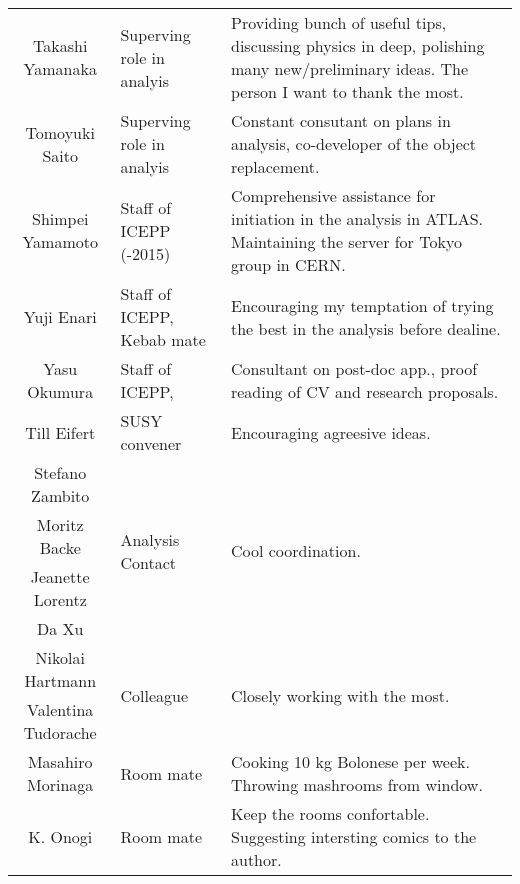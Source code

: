 \begin{table}[h]
\begin{tabularx}{\linewidth}{clX}
    Takashi Yamanaka   &   Superving role in analyis                                                      &  Providing bunch of useful tips, discussing physics in deep, polishing many new/preliminary ideas. The person I want to thank the most.  \\
    Tomoyuki Saito     &   Superving role in analyis                                                      &  Constant consutant on plans in analysis, co-developer of the object replacement.   \\   
    Shimpei Yamamoto   &   Staff of ICEPP (-2015)                                                         &  Comprehensive assistance for initiation in the analysis in ATLAS. Maintaining the server for Tokyo group in CERN.  \\   
    Yuji Enari         &   Staff of ICEPP, Kebab mate                                                     &  Encouraging my temptation of trying the best in the analysis before dealine.   \\   
    Yasu Okumura       &   Staff of ICEPP,                                                                &  Consultant on post-doc app., proof reading of CV and research proposals.   \\   
    Till Eifert        &   SUSY convener                             &  Encouraging agreesive ideas.   \\   
    Stefano Zambito    &   \multirow{4}{*}{Analysis Contact}         &  \multirow{4}{*}{Cool coordination.}   \\   
    Moritz Backe       &                            &     \\   
    Jeanette Lorentz   &            &     \\   
    Da Xu              &            &     \\   
    Nikolai Hartmann   &   \multirow{2}{*}{Colleague}                                         &  \multirow{2}{*}{Closely working with the most.}   \\   
    Valentina Tudorache&                                                                      &     \\   
    Masahiro Morinaga  &   Room mate                                                                      &  Cooking 10 kg Bolonese per week. Throwing mashrooms from window.   \\   
    K. Onogi           &   Room mate                                                                      &  Keep the rooms confortable. Suggesting intersting comics to the author.   \\   

\end{tabularx}
\end{table}
